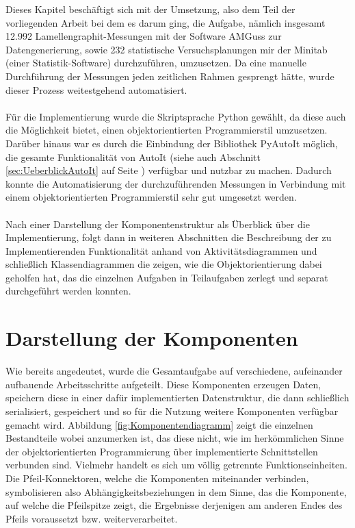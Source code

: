 \documentclass[
fontsize=10pt, 
listof = totoc,
parskip = half	
]{report}
\begin{document}
Dieses Kapitel beschäftigt sich mit der Umsetzung, also dem Teil der vorliegenden Arbeit bei dem es darum ging, die Aufgabe, nämlich insgesamt 12.992 Lamellengraphit-Messungen mit der Software AMGuss zur Datengenerierung, sowie 232 statistische Versuchsplanungen mir der Minitab (einer Statistik-Software) durchzuführen, umzusetzen. Da eine manuelle Durchführung der Messungen jeden zeitlichen Rahmen gesprengt hätte, wurde dieser Prozess weitestgehend automatisiert.
\\\\
\noindent Für die Implementierung wurde die Skriptsprache Python gewählt, da diese auch die Möglichkeit bietet, einen objektorientierten Programmierstil umzusetzen. Darüber hinaus war es durch die Einbindung der Bibliothek PyAutoIt möglich, die gesamte Funktionalität von AutoIt (siehe auch Abschnitt \ref{sec:UeberblickAutoIt} auf Seite \pageref{sec:UeberblickAutoIt}) verfügbar und nutzbar zu machen. Dadurch konnte die Automatisierung der durchzuführenden Messungen in Verbindung mit einem objektorientierten Programmierstil sehr gut umgesetzt werden.
\\\\
\noindent Nach einer Darstellung der Komponentenstruktur als Überblick über die Implementierung, folgt dann in weiteren Abschnitten die Beschreibung der zu Implementierenden Funktionalität anhand von Aktivitätsdiagrammen und schließlich Klassendiagrammen die zeigen, wie die Objektorientierung dabei geholfen hat, das die einzelnen Aufgaben in Teilaufgaben zerlegt und separat durchgeführt werden konnten.

\section{Darstellung der Komponenten}
\label{sec:Komponentendarstellung}

Wie bereits angedeutet, wurde die Gesamtaufgabe auf verschiedene, aufeinander aufbauende Arbeitsschritte aufgeteilt. Diese Komponenten erzeugen Daten, speichern diese in einer dafür implementierten Datenstruktur, die dann schließlich serialisiert, gespeichert und so für die Nutzung weitere Komponenten verfügbar gemacht wird. Abbildung \ref{fig:Komponentendiagramm} zeigt die einzelnen Bestandteile wobei anzumerken ist, das diese nicht, wie im herkömmlichen Sinne der objektorientierten Programmierung über implementierte Schnittstellen verbunden sind. Vielmehr handelt es sich um völlig getrennte Funktionseinheiten. Die Pfeil-Konnektoren, welche die Komponenten miteinander verbinden, symbolisieren also Abhängigkeitsbeziehungen in dem Sinne, das die Komponente, auf welche die Pfeilspitze zeigt, die Ergebnisse derjenigen am anderen Endes des Pfeils voraussetzt bzw. weiterverarbeitet.
\end{document}
